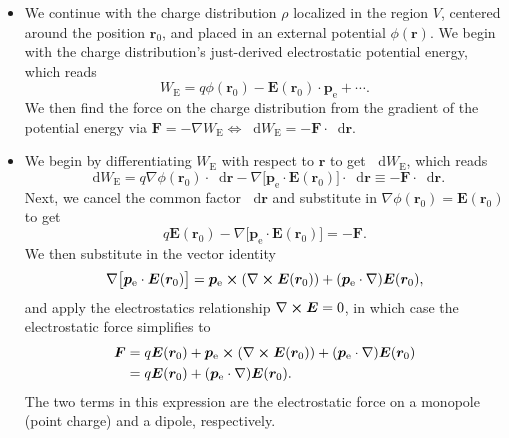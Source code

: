 \documentclass[11pt, a4paper]{article}
\newcommand{\diff}{\mathop{}\!\mathrm{d}} %
\renewcommand{\vec}[1]{\bm{#1}} %
\renewcommand{\r}{\vec{r}}
\newcommand{\E}{\vec{E}} %
\newcommand{\pe}{\vec{p}_{\text{e}}}  %
\renewcommand{\curl}{\nabla \cross}
\renewcommand{\grad}{\nabla}
\begin{document}
\begin{itemize}
    \item We continue with the charge distribution $ \rho $ localized in the region $ V $, centered around the position $ \r_{0} $, and placed in an external potential $ \phi(\r) $. We begin with the charge distribution's just-derived electrostatic potential energy, which reads
    \begin{equation*}
        W_{\text{E}} = q \phi(\r_{0}) - \E(\r_{0}) \cdot \pe + \cdots.
    \end{equation*}
    We then find the force on the charge distribution from the gradient of the potential energy via $ \vec{F} = - \grad W_{\text{E}} \iff \diff W_{\text{E}} = - \vec{F} \cdot \diff \r $. 


	\item We begin by differentiating $ W_{\text{E}} $ with respect to $ \r $ to get $ \diff W_{\text{E}} $, which reads
	\begin{equation*}
		\diff W_{\text{E}} = q \grad \phi(\r_{0}) \cdot \diff \r - \grad \big[\pe \cdot \E(\r_{0})\big] \cdot \diff \r \equiv - \vec{F} \cdot \diff \r.
	\end{equation*}
    Next, we cancel the common factor $ \diff \r $ and substitute in $ \grad \phi(\r_{0}) = \E(\r_{0}) $ to get
    \begin{equation*}
        q \E(\r_{0}) - \grad \big[\pe \cdot \E(\r_{0})\big] = - \vec{F}.
    \end{equation*}
    We then substitute in the vector identity 
	\begin{equation*}
		\grad\big[\pe \cdot \E(\r_{0})\big] = \pe \cross (\curl \E(\r_{0})) + (\pe \cdot \grad)\E(\r_{0}),
	\end{equation*}
    and apply the electrostatics relationship $ \curl \E = 0 $, in which case the electrostatic force simplifies to
    \begin{align*}
        \vec{F} &= q \E(\r_{0}) + \pe \cross (\curl \E(\r_{0})) + (\pe \cdot \grad)\E(\r_{0})\\
        & = q \E(\r_{0}) + (\pe \cdot \grad)\E(\r_{0}).
    \end{align*}
    The two terms in this expression are the electrostatic force on a monopole (point charge) and a dipole, respectively.
	
\end{itemize}
\end{document}
